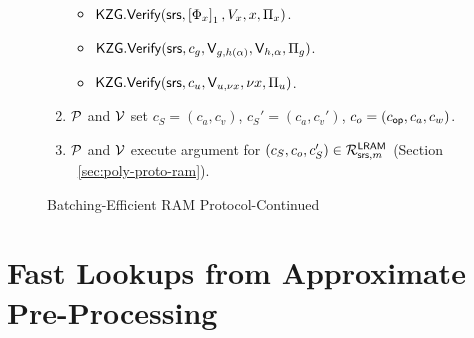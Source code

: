 \begin{figure}[t!]
\begin{mdframed}
\begin{enumerate}[leftmargin=1em, label=\arabic*.]
\begin{itemize}[leftmargin=1em]
                \item $\KZGverify(\srs, \gone{\Phi_x}, V_x, x, \Pi_x)$.
                \item $\KZGverify(\srs, c_g, \val{h(\alpha)}{g}, \val{\alpha}{h}, \Pi_g)$.
                \item $\KZGverify(\srs, c_u,\val{\nu x}{u}, \nu x, \Pi_u)$.
            \end{itemize}
            \item $\prover$ and $\verifier$ set $c_S=(c_a, c_v)$, $c_S'=(c_a, c_v')$, $c_o=(c_\op, c_a, c_w)$.
            \item $\prover$ and $\verifier$ execute argument for $(c_S, c_o, c_S')\in \CLRAM$ (Section ~\ref{sec:poly-proto-ram}).
        \end{enumerate}
    \end{mdframed}
    \caption{Batching-Efficient RAM Protocol-Continued}
    \label{fig:complete-listing-3}
\end{figure}





\section{Fast Lookups from Approximate Pre-Processing}\label{sec:update-protocol}














